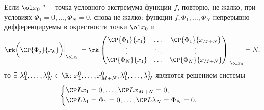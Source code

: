 
Если \(\ol x_0\) "--- точка условного экстремума функции \(f\), повторю, не жалко, при условиях \({\Phi_1=0,\ldots,\Phi_N=0}\), снова не жалко: функции \(f,\Phi_1,\ldots,\Phi_N\) непрерывно
дифференцируемы в окрестности точки \(\ol x_0\) и
\[\rk \bigg(\CP{\Phi_j}{x_k}\bigg)\bigg|_{\ol x_0} = \rk 
\left.\begin{pmatrix}
\CP{\Phi_1}{x_1} & \dots & \CP{\Phi_1}{x_{M+N}} \\
\vdots & \ddots & \vdots \\
\CP{\Phi_N}{x_1} & \dots & \CP{\Phi_N}{x_{M+N}}
\end{pmatrix}\right|_{\ol x_0} = N,\]
то \(\exists\ \lambda_1^0,\ldots,\lambda_N^0\in\R\colon x_1^0,\ldots,x_{M+N}^0,\lambda_1^0,\ldots,\lambda_N^0\) являются решением системы
\[\begin{cases}
\CP L{x_1} = 0, \ldots, \CP L{x_{M+N}}=0, \\
\CP L{\lambda_1}=\Phi_1=0, \ldots, \CP L{\lambda_N}=\Phi_N=0.
\end{cases}\]
